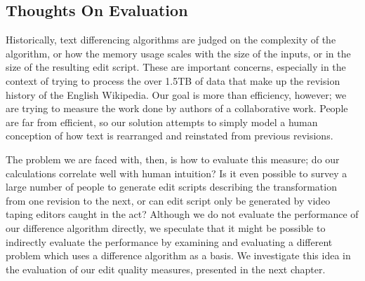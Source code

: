 \subsection{Thoughts On Evaluation}

Historically, text differencing algorithms are judged
on the complexity of the algorithm, or how the memory
usage scales with the size of the inputs, or in the
size of the resulting edit script.
These are important concerns, especially in the context of
trying to process the over 1.5TB of data that make up the
revision history of the English Wikipedia.
Our goal is more than efficiency, however; we are trying
to measure the work done by authors of a collaborative work.
People are far from efficient, so our solution attempts to
simply model a human conception of how text is rearranged
and reinstated from previous revisions.

The problem we are faced with, then, is how to evaluate
this measure; do our calculations correlate well with
human intuition?
Is it even possible to survey a large number of people
to generate edit scripts describing the transformation from
one revision to the next, or can edit script only be generated
by video taping editors caught in the act?
Although we do not evaluate the performance of our difference
algorithm directly, we speculate that it might be possible to
indirectly evaluate the performance by examining and evaluating
a different problem which uses a difference algorithm as a basis.
We investigate this idea in the evaluation of our edit quality
measures, presented in the next chapter.

